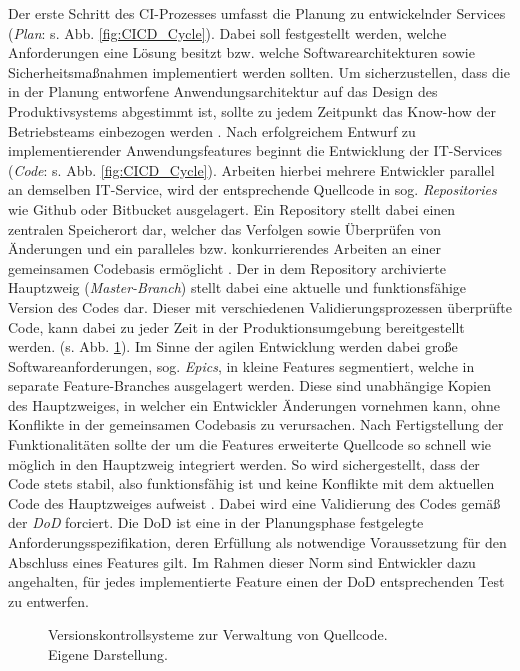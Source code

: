 Der erste Schritt des CI-Prozesses umfasst die Planung zu entwickelnder Services (\textit{Plan}: s. Abb. \ref*{fig:CICD_Cycle}). Dabei soll festgestellt werden, welche Anforderungen eine Lösung besitzt bzw. welche Softwarearchitekturen sowie Sicherheitsmaßnahmen implementiert werden sollten. Um sicherzustellen, dass die in der Planung entworfene Anwendungsarchitektur auf das Design des Produktivsystems abgestimmt ist, sollte zu jedem Zeitpunkt das Know-how der Betriebsteams einbezogen werden \cite[16]{Halstenberg.2020}. Nach erfolgreichem Entwurf zu implementierender Anwendungsfeatures beginnt die Entwicklung der IT-Services (\textit{Code}: s. Abb. \ref*{fig:CICD_Cycle}). Arbeiten hierbei mehrere Entwickler parallel an demselben IT-Service, wird der entsprechende Quellcode in sog. \textit{Repositories} wie Github oder Bitbucket ausgelagert. Ein Repository stellt dabei einen zentralen Speicherort dar, welcher das Verfolgen sowie Überprüfen von Änderungen und ein paralleles bzw. konkurrierendes Arbeiten an einer gemeinsamen Codebasis ermöglicht \cite[31]{Loeliger.2012}. Der in dem Repository archivierte Hauptzweig (\textit{Master-Branch}) stellt dabei eine aktuelle und funktionsfähige Version des Codes dar. Dieser mit verschiedenen Validierungsprozessen überprüfte Code, kann dabei zu jeder Zeit in der Produktionsumgebung bereitgestellt werden. (s. Abb. \ref*{fig:VCS}). Im Sinne der agilen Entwicklung werden dabei große Softwareanforderungen, sog. \textit{Epics}, in kleine Features segmentiert, welche in separate Feature-Branches ausgelagert werden. Diese sind unabhängige Kopien des Hauptzweiges, in welcher ein Entwickler Änderungen vornehmen kann, ohne Konflikte in der gemeinsamen Codebasis zu verursachen. Nach Fertigstellung der Funktionalitäten sollte der um die Features erweiterte Quellcode so schnell wie möglich in den Hauptzweig integriert werden. So wird sichergestellt, dass der Code stets stabil, also funktionsfähig ist und keine Konflikte mit dem aktuellen Code des Hauptzweiges aufweist \cite[169]{Loeliger.2012}. Dabei wird eine Validierung des Codes gemäß der \textit{\ac{DoD}} forciert. Die DoD ist eine in der Planungsphase festgelegte Anforderungsspezifikation, deren Erfüllung als notwendige Voraussetzung für den Abschluss eines Features gilt. Im Rahmen dieser Norm sind Entwickler dazu angehalten, für jedes implementierte Feature einen der DoD entsprechenden Test zu entwerfen.
\begin{center}
	\begin{figure}[H]
		\centering
		\caption[Versionskontrollsysteme zur Verwaltung von Quellcode]{Versionskontrollsysteme zur Verwaltung von Quellcode.\\ Eigene Darstellung.}
		\label{fig:VCS}
	\end{figure}
\end{center}
